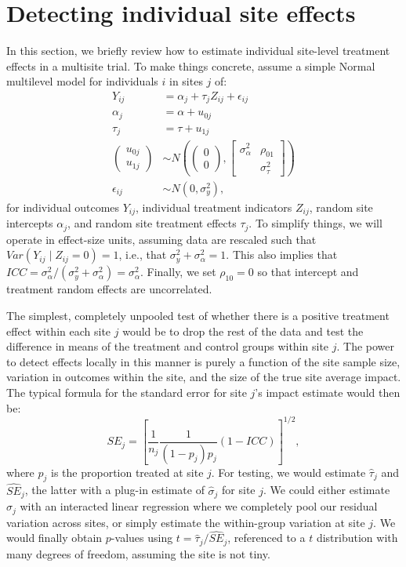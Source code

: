 \documentclass[]{article}
\begin{document}
\section{Detecting individual site effects}

In this section, we briefly review how to estimate individual site-level treatment effects in a multisite trial.
To make things concrete, assume a simple Normal multilevel model for individuals $i$ in sites $j$ of: 
\begin{align*}
	Y_{ij} &= \alpha_j + \tau_j Z_{ij} + \epsilon_{ij} \\
	\alpha_j &= \alpha + u_{0j} \\
	\tau_j &= \tau + u_{1j} \\
	\begin{pmatrix}
		u_{0j} \\ u_{1j}
	\end{pmatrix} &\sim N\left(
	\begin{pmatrix}
		0 \\ 0
	\end{pmatrix}, 
	\begin{bmatrix}
		\sigma^2_\alpha & \rho_{01} \\  & \sigma^2_\tau
	\end{bmatrix}\right) \\
	\epsilon_{ij} &\sim N(0, \sigma^2_y) ,
\end{align*}
for individual outcomes $Y_{ij}$, individual treatment indicators $Z_{ij}$, random site intercepts $\alpha_j$, and random site treatment effects $\tau_j$.
To simplify things, we will operate in effect-size units, assuming data are rescaled such that $Var(Y_{ij} \mid Z_{ij}=0) = 1$, i.e., that $\sigma^2_y + \sigma^2_\alpha = 1$.
This also implies that $ICC = \sigma^2_\alpha / (\sigma^2_y + \sigma^2_\alpha) = \sigma^2_\alpha$.
Finally, we set $\rho_{10} = 0$ so that intercept and treatment random effects are uncorrelated.

The simplest, completely unpooled test of whether there is a positive treatment effect within each site $j$ would be to drop the rest of the data and test the difference in means of the treatment and control groups within site $j$.
The power to detect effects locally in this manner is purely a function of the site sample size, variation in outcomes within the site, and the size of the true site average impact.
The typical formula for the standard error for site $j$'s impact estimate would then be:
$$ SE_j = \left[ \frac{1}{n_j} \frac{1}{(1-p_j)p_j} (1-ICC) \right]^{1/2} , $$ 
where $p_j$ is the proportion treated at site $j$.
For testing, we would estimate $\hat{\tau}_j$ and $\widehat{SE}_j$, the latter with a plug-in estimate of $\hat{\sigma}_j$ for site $j$.
We could either estimate $\hat{\sigma}_j$ with an interacted linear regression where we completely pool our residual variation across sites, or simply estimate the within-group variation at site $j$.
We would finally obtain $p$-values using $t = \hat{\tau}_j / \widehat{SE}_j$, referenced to a $t$ distribution with many degrees of freedom, assuming the site is not tiny.
\end{document}
